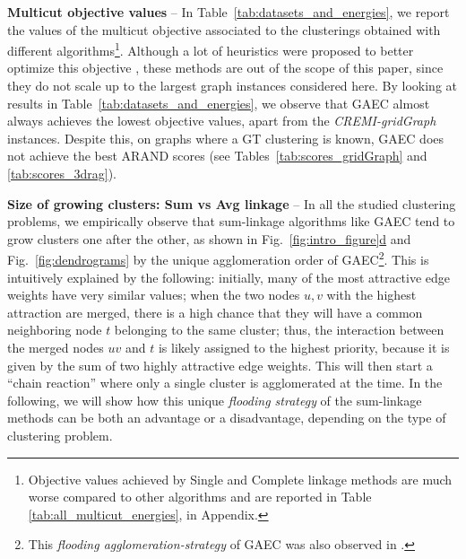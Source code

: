\textbf{Multicut objective values} -- In Table~\ref{tab:datasets_and_energies}, we report the values of the multicut objective associated to the clusterings obtained with different \algname{} algorithms\footnote{Objective values achieved by Single and Complete linkage methods are much worse compared to other algorithms and are reported in Table \ref{tab:all_multicut_energies}, in Appendix.}. Although a lot of heuristics were proposed to better optimize this objective \cite{beier2016efficient,beier2014cut,kernighan1970efficient}, these methods are out of the scope of this paper, since they do not scale up to the largest graph instances considered here. By looking at results in Table~\ref{tab:datasets_and_energies}, we observe that GAEC almost always achieves the lowest objective values, apart from the \emph{CREMI-gridGraph} instances. Despite this, on graphs where a GT clustering is known, GAEC does not achieve the best ARAND scores (see Tables~\ref{tab:scores_gridGraph} and \ref{tab:scores_3drag}). 

\textbf{Size of growing clusters: Sum vs Avg linkage} --
In all the studied clustering problems, we empirically observe that sum-linkage algorithms like GAEC tend to grow clusters one after the other, as shown in Fig.~\hyperref[fig:intro_figure]{\ref*{fig:intro_figure}d} and Fig.~\ref{fig:dendrograms} by the unique agglomeration order of GAEC\footnote{This \emph{flooding agglomeration-strategy} of GAEC was also observed in \cite{kardoostsolving}.}. This is intuitively explained by the  following: initially, many of the most attractive edge weights have very similar values; when the two nodes $u,v$ with the highest attraction are merged, there is a high chance that they will have a common neighboring node $t$ belonging to the same cluster; thus, the interaction between the merged nodes $uv$ and $t$ is likely assigned to the highest priority, because it is given by the sum of two highly attractive edge weights. This will then start a ``chain reaction'' where only a single cluster is agglomerated at the time. 
In the following, we will show how this unique \emph{flooding strategy} of the sum-linkage methods can be both an advantage or a disadvantage, depending on the type of clustering problem. 

